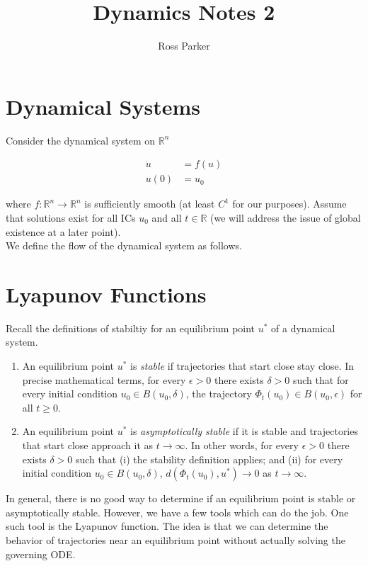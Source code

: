 \documentclass{article}
\title{Dynamics Notes 2}
\author{Ross Parker}
\def\R{{\mathbb R}}
\begin{document}
\section{Dynamical Systems}

Consider the dynamical system on $\R^n$

\begin{align*}
\dot{u} &= f(u) \\
u(0) &= u_0
\end{align*}

where $f: \R^n \rightarrow \R^n$ is sufficiently smooth (at least $C^1$ for our purposes). Assume that solutions exist for all ICs $u_0$ and all $t \in \R$ (we will address the issue of global existence at a later point).\\

We define the flow of the dynamical system as follows.

\section{Lyapunov Functions}

Recall the definitions of stabiltiy for an equilibrium point $u^*$ of a dynamical system.

\begin{enumerate}
\item An equilibrium point $u^*$ is \emph{stable} if trajectories that start close stay close. In precise mathematical terms, for every $\epsilon > 0$ there exists $\delta > 0$ such that for every initial condition $u_0 \in B(u_0, \delta)$, the trajectory $\Phi_t(u_0) \in B(u_0, \epsilon)$ for all $t \geq 0$. 
\item An equilibrium point $u^*$ is \emph{asymptotically stable} if it is stable and trajectories that start close approach it as $t \rightarrow \infty$. In other words, for every $\epsilon > 0$ there exists $\delta > 0$ such that (i) the stability definition applies; and (ii) for every initial condition $u_0 \in B(u_0, \delta)$, $d(\Phi_t(u_0), u^*) \rightarrow 0$ as $t \rightarrow \infty$.
\end{enumerate}

In general, there is no good way to determine if an equilibrium point is stable or asymptotically stable. However, we have a few tools which can do the job. One such tool is the Lyapunov function. The idea is that we can determine the behavior of trajectories near an equilibrium point without actually solving the governing ODE.\\
\end{document}
